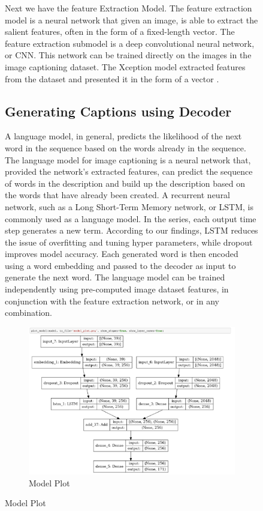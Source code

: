 \documentclass[conference]{IEEEtran}
\begin{document}
\begin{figure}[htbp]
Next we have the feature Extraction Model. The feature extraction model is a neural network that given an image, is able to extract the salient features, often in the form of a fixed-length vector. The feature extraction submodel is a deep convolutional neural network, or CNN. This network can be trained directly on the images in the image captioning dataset. The Xception model extracted features from the dataset and presented it in the form of a vector \cite {b14}.

\subsection{Generating Captions using Decoder}
A language model, in general, predicts the likelihood of the next word in the sequence based on the words already in the sequence.
The language model for image captioning is a neural network that, provided the network's extracted features, can predict the sequence of words in the description and build up the description based on the words that have already been created. A recurrent neural network, such as a Long Short-Term Memory network, or LSTM, is commonly used as a language model. In the series, each output time step generates a new term. According to our findings, LSTM reduces the issue of overfitting and tuning hyper parameters, while dropout improves model accuracy. Each generated word is then encoded using a word embedding and passed to the decoder as input to generate the next word. The language model can be trained independently using pre-computed image dataset features, in conjunction with the feature extraction network, or in any combination. 

\begin{figure}[htbp]
\centerline{\includegraphics[width=\linewidth]{modelsummary.png}}
\caption{Model Plot}
\label{fig9}
\end{figure}



\end{figure}
\end{document}

